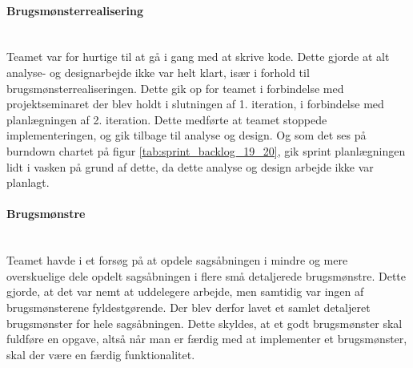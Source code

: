\documentclass[../main.tex]{subfiles}
\begin{document}
\paragraph{Brugsmønsterrealisering}\mbox{} \\
Teamet var for hurtige til at gå i gang med at skrive kode. Dette gjorde at alt analyse- og designarbejde ikke var helt klart, især i forhold til brugsmønsterrealiseringen. Dette gik op for teamet i forbindelse med projektseminaret der blev holdt i slutningen af 1. iteration, i forbindelse med planlægningen af 2. iteration. Dette medførte at teamet stoppede implementeringen, og gik tilbage til analyse og design. Og som det ses på burndown chartet på figur \ref{tab:sprint_backlog_19_20}, gik sprint planlægningen lidt i vasken på grund af dette, da dette analyse og design arbejde ikke var planlagt.   

\paragraph{Brugsmønstre}\mbox{} \\
Teamet havde i et forsøg på at opdele sagsåbningen i mindre og mere overskuelige dele opdelt sagsåbningen i flere små detaljerede brugsmønstre. Dette gjorde, at det var nemt at uddelegere arbejde, men samtidig var ingen af brugsmønsterene fyldestgørende. Der blev derfor lavet et samlet detaljeret brugsmønster for hele sagsåbningen. Dette skyldes, at et godt brugsmønster skal fuldføre en opgave, altså når man er færdig med at implementer et brugsmønster, skal der være en færdig funktionalitet.
\end{document}
